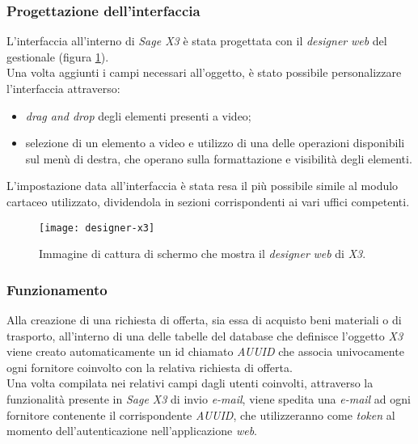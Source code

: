 \subsubsection{Progettazione dell'interfaccia}
L'interfaccia all'interno di \textit{Sage X3} è stata progettata con il \textit{designer} \textit{web} del gestionale (figura \ref{fig:designer-web}).\\
Una volta aggiunti i campi necessari all'oggetto, è stato possibile personalizzare l'interfaccia attraverso:
\begin{itemize}
	\item \textit{drag and drop} degli elementi presenti a video;
	\item  selezione di un elemento a video e utilizzo di una delle operazioni disponibili sul menù di destra, che operano sulla formattazione e visibilità degli elementi.
\end{itemize}
L'impostazione data all'interfaccia è stata resa il più possibile simile al modulo cartaceo utilizzato, dividendola in sezioni corrispondenti ai vari uffici competenti.

\begin{figure}[htbp]
	\begin{center}
		\texttt{[image: designer-x3]}
		\caption{Immagine di cattura di schermo che mostra il \textit{designer} \textit{web} di \textit{X3}.}
		\label{fig:designer-web}
	\end{center}
\end{figure}

\subsubsection{Funzionamento}
Alla creazione di una richiesta di offerta, sia essa di acquisto beni materiali o di trasporto, all'interno di una delle tabelle del database che definisce l'oggetto \textit{X3} viene creato automaticamente un id chiamato \textit{AUUID} che associa univocamente ogni fornitore coinvolto con la relativa richiesta di offerta.\\
Una volta compilata nei relativi campi dagli utenti coinvolti, attraverso la funzionalità presente in \textit{Sage X3} di invio \textit{e-mail}, viene spedita una \textit{e-mail} ad ogni fornitore contenente il corrispondente \textit{AUUID}, che utilizzeranno come \textit{token} al momento dell'autenticazione nell'applicazione \textit{web}.


